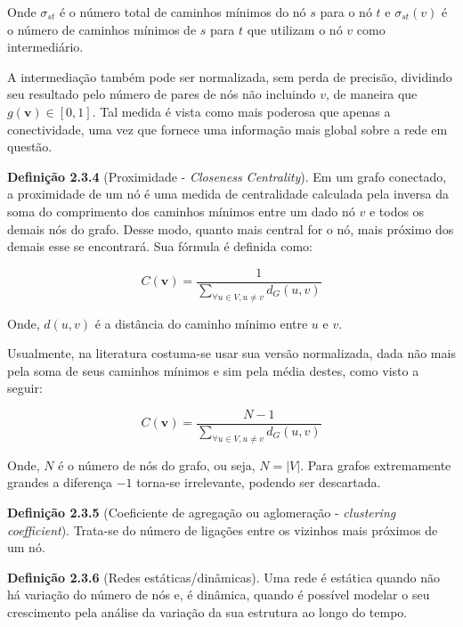 Onde $\sigma_{st}$ é o número total de caminhos mínimos do nó $s$ para o nó $t$ e $\sigma_{st}(v)$ é o número de caminhos mínimos de $s$ para $t$ que utilizam o nó $v$ como intermediário.

 A intermediação também pode ser normalizada, sem perda de precisão, dividindo seu resultado pelo número de pares de nós não incluindo $v$, de maneira que $g(\bm v) \in [0,1]$. Tal medida é vista como mais poderosa que apenas a conectividade, uma vez que fornece uma informação mais global sobre a rede em questão.

\noindent \textbf{Definição 2.3.4} (Proximidade - \textit{Closeness Centrality}). Em um grafo conectado, a proximidade de um nó é uma medida de centralidade calculada pela inversa da soma do comprimento dos caminhos mínimos entre um dado nó $v$ e todos os demais nós do grafo. Desse modo, quanto mais central for o nó, mais próximo dos demais esse se encontrará. Sua fórmula é definida como:

\begin{equation}
    C(\bm v) = \frac{1}{\sum_{\forall u \in V, u\neq v}d_G(u,v)}
\end{equation}

Onde, $d(u,v)$ é a distância do caminho mínimo entre $u$ e $v$.

Usualmente, na literatura costuma-se usar sua versão normalizada, dada não mais pela soma de seus caminhos mínimos e sim pela média destes, como visto a seguir:

\begin{equation}
    C(\bm v) = \frac{N - 1}{\sum_{\forall u \in V, u\neq v}d_G(u,v)}
\end{equation}

Onde, $N$ é o número de nós do grafo, ou seja, $N = |V|$. Para grafos extremamente grandes a diferença $- 1$ torna-se irrelevante, podendo ser descartada.


\noindent \textbf{Definição 2.3.5} (Coeficiente de agregação ou aglomeração - \textit{clustering coefficient}). Trata-se do número de ligações entre os vizinhos mais próximos de um nó.

\noindent \textbf{Definição 2.3.6} (Redes estáticas/dinâmicas). Uma rede é estática quando não há variação do número de nós e, é dinâmica, quando é possível modelar o seu crescimento pela análise da variação da sua estrutura ao longo do tempo.


